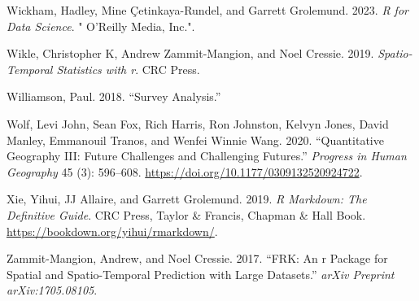 \documentclass[
  letterpaper,
  DIV=11,
  numbers=noendperiod,
  oneside]{scrreprt}
\newlength{\cslhangindent}
\newenvironment{CSLReferences}[2] %
 {\begin{list}{}{%
  \setlength{\itemindent}{0pt}
  \setlength{\leftmargin}{0pt}
  \setlength{\parsep}{0pt}
  \ifodd #1
   \setlength{\leftmargin}{\cslhangindent}
   \setlength{\itemindent}{-1\cslhangindent}
  \fi
  \setlength{\itemsep}{#2\baselineskip}}}
 {\end{list}}
\begin{document}
\begin{CSLReferences}{1}{0}
Wickham, Hadley, Mine Çetinkaya-Rundel, and Garrett Grolemund. 2023.
\emph{R for Data Science}. " O'Reilly Media, Inc.".

Wikle, Christopher K, Andrew Zammit-Mangion, and Noel Cressie. 2019.
\emph{Spatio-Temporal Statistics with r}. CRC Press.

Williamson, Paul. 2018. {``Survey Analysis.''}

Wolf, Levi John, Sean Fox, Rich Harris, Ron Johnston, Kelvyn Jones,
David Manley, Emmanouil Tranos, and Wenfei Winnie Wang. 2020.
{``Quantitative Geography III: Future Challenges and Challenging
Futures.''} \emph{Progress in Human Geography} 45 (3): 596--608.
\url{https://doi.org/10.1177/0309132520924722}.

Xie, Yihui, JJ Allaire, and Garrett Grolemund. 2019. \emph{R Markdown:
The Definitive Guide}. CRC Press, Taylor \& Francis, Chapman \& Hall
Book. \url{https://bookdown.org/yihui/rmarkdown/}.

Zammit-Mangion, Andrew, and Noel Cressie. 2017. {``FRK: An r Package for
Spatial and Spatio-Temporal Prediction with Large Datasets.''}
\emph{arXiv Preprint arXiv:1705.08105}.

\end{CSLReferences}
\end{document}

